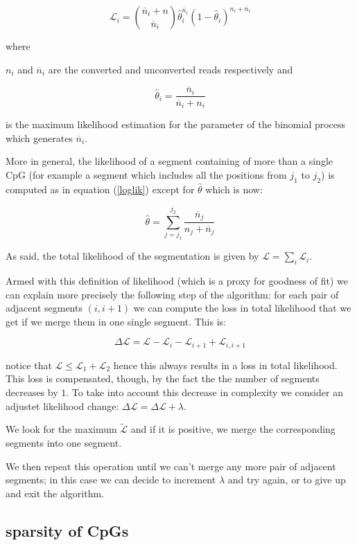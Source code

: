 \documentclass[11pt]{amsart}
\newcommand{\lik}{\ensuremath{\mathcal{L}}}
\begin{document}
\[\lik_i={\overline{n}_i+n \choose \overline{n}_i}
	\hat{\theta}_i^{\overline{n}_i}(1-\hat{\theta}_i)^{n_i+\overline{n}_i}\]
\label{loglik}

where

$n_i$ and $\overline{n}_i$ are the converted and unconverted reads respectively 
and

\[\hat{\theta}_i=\frac{\overline{n}_i}{\overline{n}_i+n_i}\]

is the maximum likelihood estimation for the parameter of the binomial process 
which generates $\overline{n}_i$.

More in general, the likelihood of a segment containing of more than a single CpG  
(for example a segment which includes all the positions from $j_1$ to $j_2$) is 
computed as in equation (\ref{loglik}) except for $\hat{\theta}$ which is now:

\[
\hat{\theta}=\sum_{j=j_1}^{j_2} \frac{\overline{n}_j}{n_j+\overline{n}_j}
\]

As said, the total likelihood of the segmentation is given by 
$\mathcal{L}=\sum_i\mathcal{L}_i$.

Armed with this definition of likelihood (which is a proxy for goodness of fit) 
we can explain more precisely the following step of the algorithm:
for each pair of adjacent segments $(i,i+1)$ we can compute the loss in 
total likelihood that we get if we merge them
in one single segment. This is:

\[\Delta \lik=\lik-\mathcal{L}_i-\mathcal{L}_{i+1}+\mathcal{L}_{i,i+1}\]

notice that $\mathcal{L} \leq \mathcal{L}_1+\mathcal{L}_2$ hence this always 
results in a loss in total 
likelihood. This loss is compensated, though, by the fact the the number 
of segments decreases by $1$. To take into account this decrease in 
complexity we consider an adjustet likelihood change:
$\Delta \lik = \Delta \lik+\lambda$.

We look for the maximum $\tilde{\lik}$ and if it is positive, we merge the
corresponding segments into one segment.

We then repeat this operation until we can't merge any more pair of adjacent 
segments; in this case we can decide to increment 
$\lambda$ and try again, or to give up and exit the algorithm.

\subsection{sparsity of CpGs}
\end{document}
